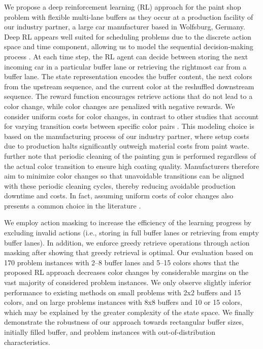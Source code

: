 \documentclass[11pt]{elsarticle}
\newcommand{\blackversion}{ }
\newcommand{\blackorcolor}{
\ifdefined\blackversion
	\color{black}
\fi
}
\newcommand{\REV}[1]{{\color{myblue}\blackorcolor #1}}
\begin{document}

We propose a deep reinforcement learning (RL) approach for the paint shop problem with flexible multi-lane buffers as they occur at a production facility of our industry partner, a large car manufacturer based in Wolfsburg, Germany. Deep RL appears well suited for scheduling problems due to the discrete action space and time component, allowing us to model the sequential decision-making process \citep[e.g.,][]{Brammer.2022a,Brammer.2022b,Mosadegh.2020}. At each time step, the RL agent can decide between storing the next incoming car in a particular buffer lane or retrieving the rightmost car from a buffer lane. The state representation encodes the buffer content, the next colors from the upstream sequence, and the current color at the reshuffled downstream sequence. The reward function encourages retrieve actions that do not lead to a color change, while color changes are penalized with negative rewards. We consider uniform costs for color changes, in contrast to other studies that account for varying transition costs between specific color pairs \citep[e.g.,][]{Leng.2020,Leng.2023}. This modeling choice is based on the manufacturing process of our industry partner, where setup costs due to production halts significantly outweigh material costs from paint waste. \REV{\citet{Bysko.2020} further note that periodic cleaning of the painting gun is performed regardless of the actual color transition to ensure high coating quality. Manufacturers therefore aim to minimize color changes so that unavoidable transitions can be aligned with these periodic cleaning cycles, thereby reducing avoidable production downtime and costs. In fact, assuming uniform costs of color changes also presents a common choice in the literature \citep[e.g.,][]{Bysko.2020,Huang.2024,taube2018resequencing,wu2021mathematical}.}


We employ action masking to increase the efficiency of the learning progress by excluding invalid actions (i.e., storing in full buffer lanes or retrieving from empty buffer lanes). In addition, we enforce greedy retrieve operations through action masking after showing that greedy retrieval is optimal. Our evaluation based on 170 problem instances with 2--8 buffer lanes and 5--15 colors shows that the proposed RL approach decreases color changes by considerable margins on the vast majority of considered problem instances.
We only observe slightly inferior performance to existing methods on small problems with 2x2 buffers and 15 colors, and
on large problems instances with 8x8 buffers and 10 or 15 colors, which may be explained by the greater complexity of the state space. 
We finally demonstrate the robustness of our approach towards rectangular buffer sizes, initially filled buffer, and problem instances with out-of-distribution characteristics.
\end{document}

